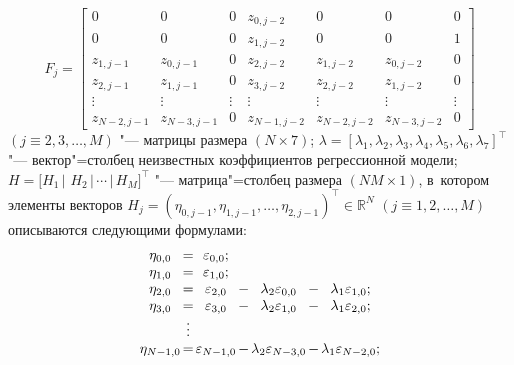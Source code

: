 \[
F_j= \begin{bmatrix}
0 & 0 & 0 & z_{0,j-2} & 0 & 0 & 0 \\
0 & 0 & 0 & z_{1,j-2} & 0 & 0 & 1 \\
z_{1,j-1} & z_{0,j-1} & 0 & z_{2,j-2} & z_{1,j-2} & z_{0,j-2} & 0 \\
z_{2,j-1} & z_{1,j-1} & 0 & z_{3,j-2} & z_{2,j-2} & z_{1,j-2} & 0 \\
\vdots & \vdots & \vdots & \vdots & \vdots & \vdots & \vdots \\
z_{N-2,j-1} & z_{N-3,j-1} & 0 & z_{N-1,j-2} & z_{N-2,j-2} & z_{N-3,j-2} & 0
\end{bmatrix} 
\]
$(j\equiv 2, 3, \ldots, M)$ "--- матрицы размера $(N{\times}7)$; 
$\lambda=[\lambda_1, \lambda_2, \lambda_3, \lambda_4, \lambda_5, \lambda_6, \lambda_7]^\top$ "--- вектор"=столбец неизвестных коэффициентов регрессионной модели; $H=[H_1 \, | $ $ H_2 \, |\, \cdots \,  | \, H_M]^\top$ "--- матрица"=столбец размера $(NM{\times}1)$, в~котором элементы векторов $H_j=(\eta_{0,j-1},\eta_{1,j-1},\ldots,\eta_{2,j-1})^\top\in \mathbb R^N$ $(j\equiv1, 2,\ldots, M)$ описываются следующими формулами:
\[ \begin{array}{cccccccc}
\eta_{0,0} & \hspace{-3mm} =\hspace{-3mm} & \varepsilon_{0,0}; \\
\eta_{1,0} & \hspace{-3mm}= \hspace{-3mm}& \varepsilon_{1,0}; \\
\eta_{2,0} & \hspace{-3mm}= \hspace{-3mm}& \varepsilon_{2,0} & \hspace{-3mm}-\hspace{-3mm} &\lambda_2\varepsilon_{0,0}& \hspace{-3mm}-\hspace{-3mm} &\lambda_1\varepsilon_{1,0} ;\\
\eta_{3,0} & \hspace{-3mm}= \hspace{-3mm}& \varepsilon_{3,0} & \hspace{-3mm}-\hspace{-3mm} &\lambda_2\varepsilon_{1,0}& \hspace{-3mm}-\hspace{-3mm}&\lambda_1\varepsilon_{2,0} ;\\
& \hspace{-3mm}\vdots \hspace{-3mm}\\
\eta_{N-1,0} & \hspace{-3mm}= \hspace{-3mm}& \varepsilon_{N-1,0} & \hspace{-3mm}-\hspace{-3mm}&\lambda_2\varepsilon_{N-3,0}& \hspace{-3mm}-\hspace{-3mm}&\lambda_1\varepsilon_{N-2,0} ;
\end{array} \]
